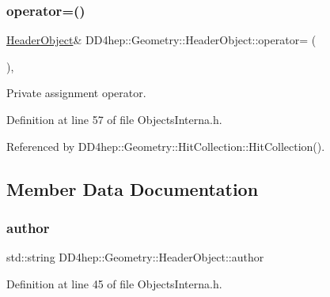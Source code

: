 \subsubsection{\texorpdfstring{operator=()}{operator=()}}
{\footnotesize\ttfamily \hyperlink{class_d_d4hep_1_1_geometry_1_1_header_object}{Header\+Object}\& D\+D4hep\+::\+Geometry\+::\+Header\+Object\+::operator= (\begin{DoxyParamCaption}\item[{const \hyperlink{class_d_d4hep_1_1_geometry_1_1_header_object}{Header\+Object} \&}]{ }\end{DoxyParamCaption})\hspace{0.3cm}{\ttfamily [inline]}, {\ttfamily [private]}}



Private assignment operator. 



Definition at line 57 of file Objects\+Interna.\+h.



Referenced by D\+D4hep\+::\+Geometry\+::\+Hit\+Collection\+::\+Hit\+Collection().



\subsection{Member Data Documentation}
\hypertarget{class_d_d4hep_1_1_geometry_1_1_header_object_a63216a220333f0c791f5dc9676e9c38d}{}\label{class_d_d4hep_1_1_geometry_1_1_header_object_a63216a220333f0c791f5dc9676e9c38d} 
\subsubsection{\texorpdfstring{author}{author}}
{\footnotesize\ttfamily std\+::string D\+D4hep\+::\+Geometry\+::\+Header\+Object\+::author}



Definition at line 45 of file Objects\+Interna.\+h.

\hypertarget{class_d_d4hep_1_1_geometry_1_1_header_object_aead0ebf0a1dcc61fbb5f30ca5113484f}{}\label{class_d_d4hep_1_1_geometry_1_1_header_object_aead0ebf0a1dcc61fbb5f30ca5113484f} 
